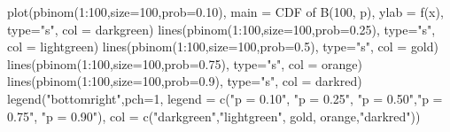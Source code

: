 \documentclass[
  letterpaper,
  DIV=11,
  numbers=noendperiod]{scrreprt}
\newenvironment{Shaded}{\begin{snugshade}}{\end{snugshade}}
\newcommand{\AttributeTok}[1]{\textcolor[rgb]{0.40,0.45,0.13}{#1}}
\newcommand{\DecValTok}[1]{\textcolor[rgb]{0.68,0.00,0.00}{#1}}
\newcommand{\FloatTok}[1]{\textcolor[rgb]{0.68,0.00,0.00}{#1}}
\newcommand{\FunctionTok}[1]{\textcolor[rgb]{0.28,0.35,0.67}{#1}}
\newcommand{\NormalTok}[1]{\textcolor[rgb]{0.00,0.23,0.31}{#1}}
\newcommand{\SpecialCharTok}[1]{\textcolor[rgb]{0.37,0.37,0.37}{#1}}
\newcommand{\StringTok}[1]{\textcolor[rgb]{0.13,0.47,0.30}{#1}}
\begin{document}
\begin{Shaded}
\begin{Highlighting}[]
\FunctionTok{plot}\NormalTok{(}\FunctionTok{pbinom}\NormalTok{(}\DecValTok{1}\SpecialCharTok{:}\DecValTok{100}\NormalTok{,}\AttributeTok{size=}\DecValTok{100}\NormalTok{,}\AttributeTok{prob=}\FloatTok{0.10}\NormalTok{), }\AttributeTok{main =} \StringTok{\textquotesingle{}CDF of B(100, p)\textquotesingle{}}\NormalTok{, }\AttributeTok{ylab =} \StringTok{\textquotesingle{}f(x)\textquotesingle{}}\NormalTok{, }\AttributeTok{type=}\StringTok{"s"}\NormalTok{, }\AttributeTok{col =} \StringTok{\textquotesingle{}darkgreen\textquotesingle{}}\NormalTok{)}
\FunctionTok{lines}\NormalTok{(}\FunctionTok{pbinom}\NormalTok{(}\DecValTok{1}\SpecialCharTok{:}\DecValTok{100}\NormalTok{,}\AttributeTok{size=}\DecValTok{100}\NormalTok{,}\AttributeTok{prob=}\FloatTok{0.25}\NormalTok{), }\AttributeTok{type=}\StringTok{"s"}\NormalTok{, }\AttributeTok{col =} \StringTok{\textquotesingle{}lightgreen\textquotesingle{}}\NormalTok{)}
\FunctionTok{lines}\NormalTok{(}\FunctionTok{pbinom}\NormalTok{(}\DecValTok{1}\SpecialCharTok{:}\DecValTok{100}\NormalTok{,}\AttributeTok{size=}\DecValTok{100}\NormalTok{,}\AttributeTok{prob=}\FloatTok{0.5}\NormalTok{), }\AttributeTok{type=}\StringTok{"s"}\NormalTok{, }\AttributeTok{col =} \StringTok{\textquotesingle{}gold\textquotesingle{}}\NormalTok{)}
\FunctionTok{lines}\NormalTok{(}\FunctionTok{pbinom}\NormalTok{(}\DecValTok{1}\SpecialCharTok{:}\DecValTok{100}\NormalTok{,}\AttributeTok{size=}\DecValTok{100}\NormalTok{,}\AttributeTok{prob=}\FloatTok{0.75}\NormalTok{), }\AttributeTok{type=}\StringTok{"s"}\NormalTok{, }\AttributeTok{col =} \StringTok{\textquotesingle{}orange\textquotesingle{}}\NormalTok{)}
\FunctionTok{lines}\NormalTok{(}\FunctionTok{pbinom}\NormalTok{(}\DecValTok{1}\SpecialCharTok{:}\DecValTok{100}\NormalTok{,}\AttributeTok{size=}\DecValTok{100}\NormalTok{,}\AttributeTok{prob=}\FloatTok{0.9}\NormalTok{), }\AttributeTok{type=}\StringTok{"s"}\NormalTok{, }\AttributeTok{col =} \StringTok{\textquotesingle{}darkred\textquotesingle{}}\NormalTok{)}
\FunctionTok{legend}\NormalTok{(}\StringTok{"bottomright"}\NormalTok{,}\AttributeTok{pch=}\DecValTok{1}\NormalTok{,}
       \AttributeTok{legend =} \FunctionTok{c}\NormalTok{(}\StringTok{"p = 0.10"}\NormalTok{, }\StringTok{"p = 0.25"}\NormalTok{, }\StringTok{"p = 0.50"}\NormalTok{,}\StringTok{"p = 0.75"}\NormalTok{, }\StringTok{"p = 0.90"}\NormalTok{),}
       \AttributeTok{col =} \FunctionTok{c}\NormalTok{(}\StringTok{"darkgreen"}\NormalTok{,}\StringTok{"lightgreen"}\NormalTok{, }\StringTok{\textquotesingle{}gold\textquotesingle{}}\NormalTok{, }\StringTok{\textquotesingle{}orange\textquotesingle{}}\NormalTok{,}\StringTok{"darkred"}\NormalTok{))}
\end{Highlighting}
\end{Shaded}
\end{document}
